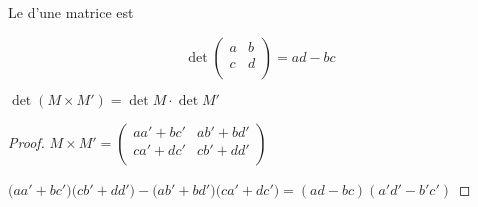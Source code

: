 \begin{frame}
Le  d'une matrice est 

$$\det \left(\begin{matrix} a & b \\ c & d \\ \end{matrix}\right) = ad-bc$$

\pause

\begin{lemme}
\label{lem:det}
$\det (M\times M') = \det M \cdot \det M'$
\end{lemme}


\pause

\begin{proof}
$M\times M' = \left(\begin{matrix} aa'+bc' & ab' + bd' \\ ca'+dc' & cb'+dd' \\ \end{matrix}\right)$

\pause

$\big(aa'+bc'  \big) \big( cb'+dd' \big) - 
\big( ab' + bd' \big) \big( ca'+dc' \big) = (ad-bc)(a'd'-b'c')$  

\end{proof}

\end{frame}



